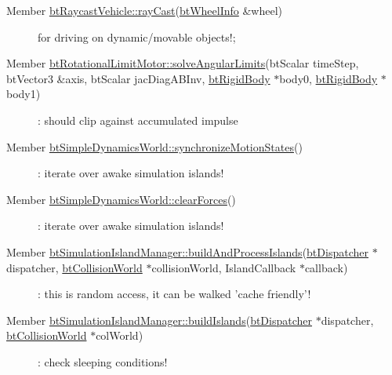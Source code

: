 \label{todo__todo000038}
\hypertarget{todo__todo000038}{}
 \begin{description}
\item[Member \hyperlink{classbt_raycast_vehicle_53451c4e3495561f3f078b2041ef04be}{btRaycastVehicle::rayCast}(\hyperlink{structbt_wheel_info}{btWheelInfo} \&wheel) ]for driving on dynamic/movable objects!; \end{description}


\label{todo__todo000028}
\hypertarget{todo__todo000028}{}
 \begin{description}
\item[Member \hyperlink{classbt_rotational_limit_motor_d52e9b1c402c7bdd47fb1a9de28afb7e}{btRotationalLimitMotor::solveAngularLimits}(btScalar timeStep, btVector3 \&axis, btScalar jacDiagABInv, \hyperlink{classbt_rigid_body}{btRigidBody} $\ast$body0, \hyperlink{classbt_rigid_body}{btRigidBody} $\ast$body1) ]: should clip against accumulated impulse \end{description}


\label{todo__todo000034}
\hypertarget{todo__todo000034}{}
 \begin{description}
\item[Member \hyperlink{classbt_simple_dynamics_world_91e996f5ce6e465e805565ee0ba14824}{btSimpleDynamicsWorld::synchronizeMotionStates}() ]: iterate over awake simulation islands! \end{description}


\label{todo__todo000033}
\hypertarget{todo__todo000033}{}
 \begin{description}
\item[Member \hyperlink{classbt_simple_dynamics_world_c44c80444f4d6d4e3c2955dd43b7a93a}{btSimpleDynamicsWorld::clearForces}() ]: iterate over awake simulation islands! \end{description}


\label{todo__todo000017}
\hypertarget{todo__todo000017}{}
 \begin{description}
\item[Member \hyperlink{classbt_simulation_island_manager_b0f52dc46bc01c6754f4cb32ba26c99a}{btSimulationIslandManager::buildAndProcessIslands}(\hyperlink{classbt_dispatcher}{btDispatcher} $\ast$dispatcher, \hyperlink{classbt_collision_world}{btCollisionWorld} $\ast$collisionWorld, IslandCallback $\ast$callback) ]: this is random access, it can be walked 'cache friendly'! \end{description}


\label{todo__todo000016}
\hypertarget{todo__todo000016}{}
 \begin{description}
\item[Member \hyperlink{classbt_simulation_island_manager_ea0b5869eca2d034ac9c643e149a5e01}{btSimulationIslandManager::buildIslands}(\hyperlink{classbt_dispatcher}{btDispatcher} $\ast$dispatcher, \hyperlink{classbt_collision_world}{btCollisionWorld} $\ast$colWorld) ]: check sleeping conditions! \end{description}


